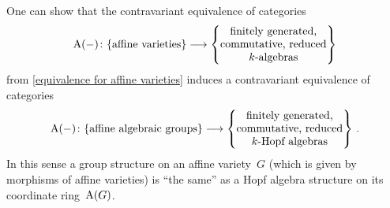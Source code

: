 \begin{remark}
  One can show that the contravariant equivalence of categories
  \begin{align*}
            \coord(-)
    \colon  \{
              \text{affine varieties}
            \}
    \longto \left\{
              \begin{tabular}{@{}c@{}}
                finitely generated,   \\
                commutative, reduced  \\
                \dash{$k$}{algebras}
              \end{tabular}
            \right\}
  \end{align*}
  from \cref{equivalence for affine varieties} induces a contravariant equivalence of categories
  \begin{align*}
            \coord(-)
    \colon  \{
              \text{affine algebraic groups}
            \}
    \longto \left\{
              \begin{tabular}{@{}c@{}}
                finitely generated, \\
                commutative, reduced  \\
                \dash{$k$}{Hopf algebras}
              \end{tabular}
            \right\} \,.
  \end{align*}
  In this sense a group structure on an affine variety~$G$ (which is given by morphisms of affine varieties) is \enquote{the same} as a Hopf algebra structure on its coordinate ring~$\operatorname{A}(G)$.
\end{remark}




